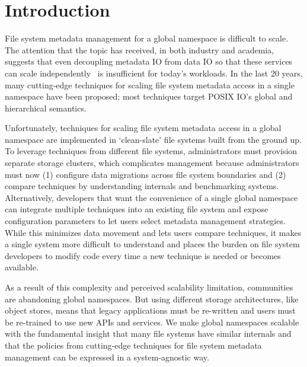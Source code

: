 \chapter{Introduction}

File system metadata management for a global namespace is difficult to scale.
The attention that the topic has received, in both industry and academia,
suggests that even decoupling metadata IO from data IO so that these services
can scale independently~\cite{alam:pdsw2011-metadata-scaling,
ghemawat:sosp2003-gfs, hildebrand:msst2005-pnfs, weil:osdi2006-ceph,
welch:fast08-panasas, xing:sc2009-skyfs} is insufficient for today's
workloads. In the last 20 years, many cutting-edge techniques for scaling file
system metadata access in a single namespace have been proposed; most
techniques target POSIX IO's global and hierarchical semantics.

Unfortunately, techniques for scaling file system metadata access in a global
namespace are implemented in `clean-slate' file systems built from the ground
up. To leverage techniques from different file systems, administrators must
provision separate storage clusters, which complicates management because
administrators must now (1) configure data migrations across file system
boundaries and (2) compare techniques by understanding internals and
benchmarking systems.  Alternatively, developers that want the convenience of a
single global namespace can integrate multiple techniques into an existing file
system and expose configuration parameters to let users select metadata
management strategies.  While this minimizes data movement and lets users
compare techniques, it makes a single system more difficult to understand and
places the burden on file system developers to modify code every time a new
technique is needed or becomes available.

As a result of this complexity and perceived scalability limitation,
communities are abandoning global namespaces. But using different storage
architectures, like object stores, means that legacy applications must be
re-written and users must be re-trained to use new APIs and services. We make
global namespaces scalable with the fundamental insight that many file systems
have similar internals and that the policies from cutting-edge techniques for
file system metadata management can be expressed in a system-agnostic way.

